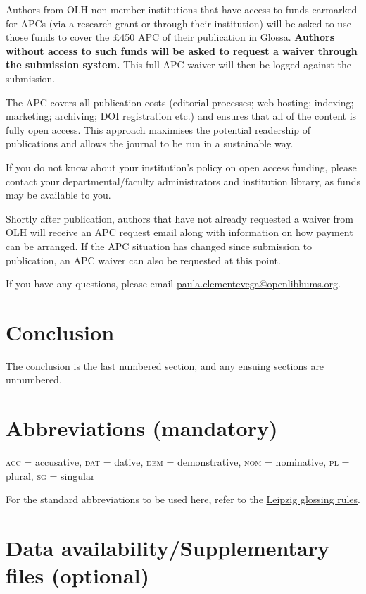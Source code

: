 \documentclass[charis,linguex,biblatex]{glossa}
\begin{document}
Authors from OLH non-member institutions that have access to funds earmarked for APCs (via a research grant or through their institution) will be asked to use those funds to cover the £450 APC of their publication in Glossa. \textbf{Authors without access to such funds will be asked to request a waiver through the submission system.} This full APC waiver will then be logged against the submission.

The APC covers all publication costs (editorial processes; web hosting; indexing; marketing; archiving; DOI registration etc.) and ensures that all of the content is fully open access. This approach maximises the potential readership of publications and allows the journal to be run in a sustainable way.

If you do not know about your institution’s policy on open access funding, please contact your departmental/faculty administrators and institution library, as funds may be available to you.

Shortly after publication, authors that have not already requested a waiver from OLH will receive an APC request email along with information on how payment can be arranged. If the APC situation has changed since submission to publication, an APC waiver can also be requested at this point. 

If you have any questions, please email \href{mailto:paula.clementevega@openlibhums.org}{paula.clementevega@openlibhums.org}. 

\section{Conclusion}

The conclusion is the last numbered section, and any ensuing sections are unnumbered.

\section*{Abbreviations (mandatory)}\label{abbrev}

\textsc{acc} = accusative, \textsc{dat} = dative, \textsc{dem} = demonstrative, \textsc{nom} = nominative, \textsc{pl} = plural, \textsc{sg} = singular

For the standard abbreviations to be used here, refer to the \href{https://www.eva.mpg.de/lingua/resources/glossing-rules.php}{Leipzig glossing rules}. 

\section*{Data availability/Supplementary files (optional)}
\end{document}
